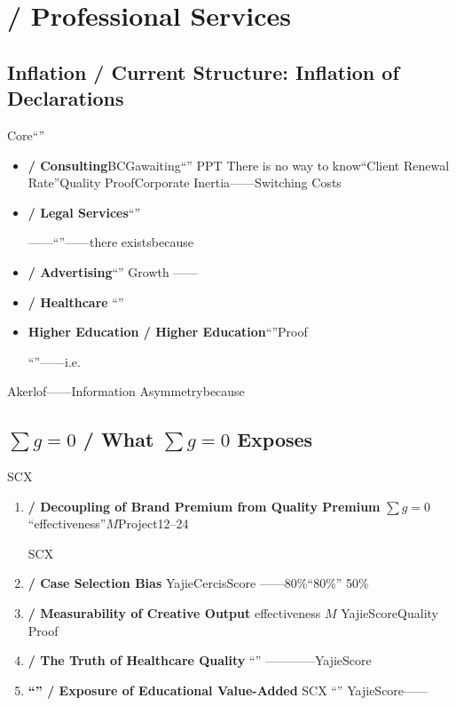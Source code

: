 \documentclass[12pt,a4paper]{article}
\theoremstyle{remark}
\newcommand{\sumgeq}{\sum g = 0}
\begin{document}
\section{ / Professional Services}

\subsection{Inflation / Current Structure: Inflation of Declarations}

Core``''
\textbf{}

\begin{itemize}[leftmargin=*]
    \item \textbf{ / Consulting}BCGawaiting``''
    PPT
    There is no way to know``Client Renewal Rate''Quality ProofCorporate Inertia——Switching Costs
    

    \item \textbf{ / Legal Services}``''
    
    ——``''——there existsbecause

    \item \textbf{ / Advertising}``''
    Growth
    ——

    \item \textbf{ / Healthcare}
    ``''

    \item \textbf{Higher Education / Higher Education}``''Proof
    
    ``''——i.e.
\end{itemize}

\textbf{}
Akerlof——Information Asymmetrybecause

\subsection{$\sumgeq$ / What $\sumgeq$ Exposes}

SCX

\begin{enumerate}[leftmargin=*, label=\textbf{(\arabic*)}]
    \item \textbf{ / Decoupling of Brand Premium from Quality Premium}
    $\sumgeq$``effectiveness''$M$Project12--24
    
    SCX\textbf{}

    \item \textbf{ / Case Selection Bias}
    YajieCercisScore
    ——80\%``80\%''
    50\%

    \item \textbf{ / Measurability of Creative Output}
    effectiveness
    $M$
    YajieScoreQuality Proof

    \item \textbf{ / The Truth of Healthcare Quality}
    ``''
    ————YajieScore

    \item \textbf{``'' / Exposure of Educational Value-Added}
    SCX
    ``''
    YajieScore——
\end{enumerate}
\end{document}
